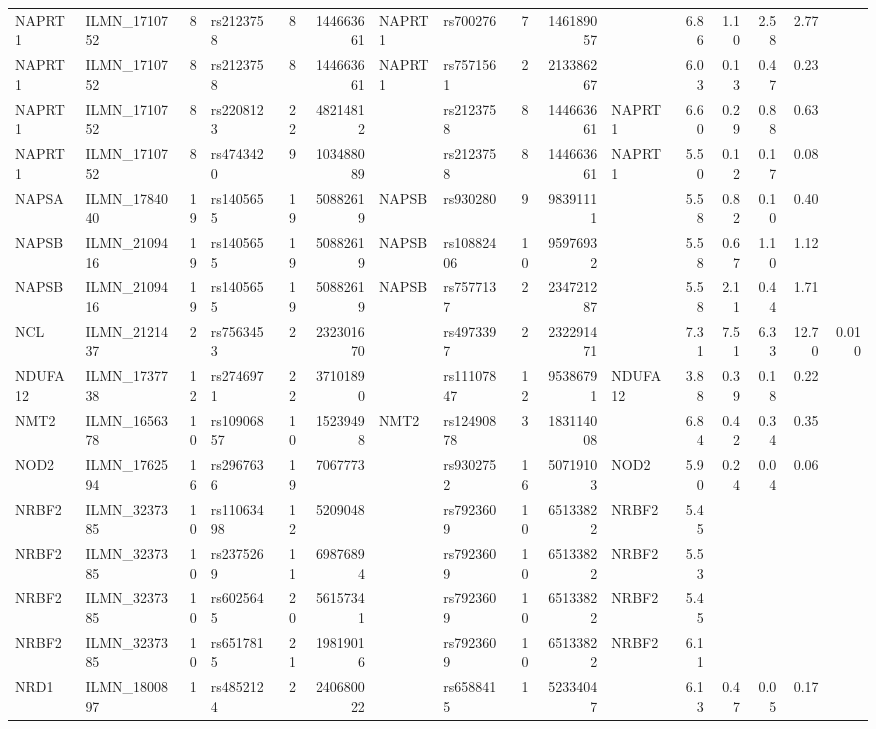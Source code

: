 \documentclass{article}
\begin{document}
\begin{landscape}
{\begin{ThreePartTable}
\begin{longtable}{|llr|lrrl|lrrl|rrrr|r|}
NAPRT1 & ILMN\_1710752 & 8 & rs2123758 & 8 & 144663661 & NAPRT1 & rs700276 & 7 & 146189057 &  & 6.86 & 1.10 & 2.58 & 2.77 &  \\
NAPRT1 & ILMN\_1710752 & 8 & rs2123758 & 8 & 144663661 & NAPRT1 & rs7571561 & 2 & 213386267 &  & 6.03 & 0.13 & 0.47 & 0.23 &  \\
NAPRT1 & ILMN\_1710752 & 8 & rs2208123 & 22 & 48214812 &  & rs2123758 & 8 & 144663661 & NAPRT1 & 6.60 & 0.29 & 0.88 & 0.63 &  \\
NAPRT1 & ILMN\_1710752 & 8 & rs4743420 & 9 & 103488089 &  & rs2123758 & 8 & 144663661 & NAPRT1 & 5.50 & 0.12 & 0.17 & 0.08 &  \\
NAPSA & ILMN\_1784040 & 19 & rs1405655 & 19 & 50882619 & NAPSB & rs930280 & 9 & 98391111 &  & 5.58 & 0.82 & 0.10 & 0.40 &  \\
NAPSB & ILMN\_2109416 & 19 & rs1405655 & 19 & 50882619 & NAPSB & rs10882406 & 10 & 95976932 &  & 5.58 & 0.67 & 1.10 & 1.12 &  \\
NAPSB & ILMN\_2109416 & 19 & rs1405655 & 19 & 50882619 & NAPSB & rs7577137 & 2 & 234721287 &  & 5.58 & 2.11 & 0.44 & 1.71 &  \\
NCL & ILMN\_2121437 & 2 & rs7563453 & 2 & 232301670 &  & rs4973397 & 2 & 232291471 &  & 7.31 & 7.51 & 6.33 & 12.70 & 0.010 \\
NDUFA12 & ILMN\_1737738 & 12 & rs2746971 & 22 & 37101890 &  & rs11107847 & 12 & 95386791 & NDUFA12 & 3.88 & 0.39 & 0.18 & 0.22 &  \\
NMT2 & ILMN\_1656378 & 10 & rs10906857 & 10 & 15239498 & NMT2 & rs12490878 & 3 & 183114008 &  & 6.84 & 0.42 & 0.34 & 0.35 &  \\
NOD2 & ILMN\_1762594 & 16 & rs2967636 & 19 & 7067773 &  & rs9302752 & 16 & 50719103 & NOD2 & 5.90 & 0.24 & 0.04 & 0.06 &  \\
NRBF2 & ILMN\_3237385 & 10 & rs11063498 & 12 & 5209048 &  & rs7923609 & 10 & 65133822 & NRBF2 & 5.45 &  &  &  &  \\
NRBF2 & ILMN\_3237385 & 10 & rs2375269 & 11 & 69876894 &  & rs7923609 & 10 & 65133822 & NRBF2 & 5.53 &  &  &  &  \\
NRBF2 & ILMN\_3237385 & 10 & rs6025645 & 20 & 56157341 &  & rs7923609 & 10 & 65133822 & NRBF2 & 5.45 &  &  &  &  \\
NRBF2 & ILMN\_3237385 & 10 & rs6517815 & 21 & 19819016 &  & rs7923609 & 10 & 65133822 & NRBF2 & 6.11 &  &  &  &  \\
NRD1 & ILMN\_1800897 & 1 & rs4852124 & 2 & 240680022 &  & rs6588415 & 1 & 52334047 &  & 6.13 & 0.47 & 0.05 & 0.17 &  \\

\end{longtable}
\end{ThreePartTable}}
\end{landscape}
\end{document}
